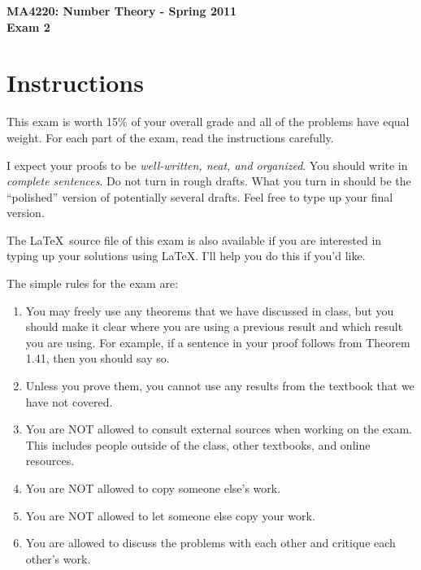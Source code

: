 \documentclass[11pt]{article}
\theoremstyle{definition}
\begin{document}
\begin{center}

{\Large\bf MA4220: Number Theory - Spring 2011}\\
\smallskip
{\Large\bf Exam 2}

\bigskip


\end{center}

\setlength{\fboxsep}{10pt}

\section*{Instructions}

This exam is worth 15\% of your overall grade and all of the problems have equal weight.  For each part of the exam, read the instructions carefully.

\bigskip

I expect your proofs to be \emph{well-written, neat, and organized}.  You should write in \emph{complete sentences}.  Do not turn in rough drafts.  What you turn in should be the ``polished'' version of potentially several drafts.  Feel free to type up your final version.  

\bigskip

The \LaTeX\ source file of this exam is also available if you are interested in typing up your solutions using \LaTeX.  I'll help you do this if you'd like.

\bigskip

The simple rules for the exam are:

\begin{enumerate}
\item You may freely use any theorems that we have discussed in class, but you should make it clear where you are using a previous result and which result you are using.  For example, if a sentence in your proof follows from Theorem 1.41, then you should say so.
\item Unless you prove them, you cannot use any results from the textbook that we have not covered.
\item You are NOT allowed to consult external sources when working on the exam.  This includes people outside of the class, other textbooks, and online resources.
\item You are NOT allowed to copy someone else's work.
\item You are NOT allowed to let someone else copy your work.
\item You are allowed to discuss the problems with each other and critique each other's work.
\end{enumerate}
\end{document}
